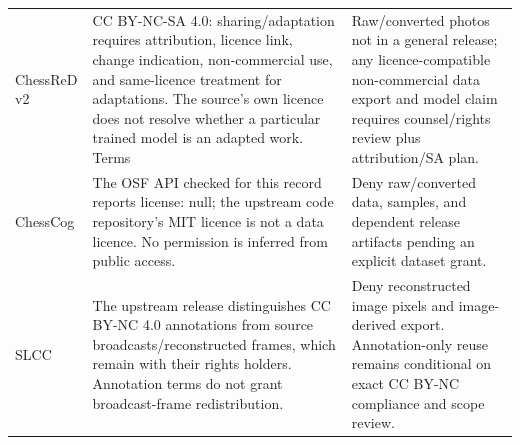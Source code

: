 \begin{longtable}{>{\raggedright\arraybackslash}p{.18\linewidth}>{\raggedright\arraybackslash}p{.39\linewidth}>{\raggedright\arraybackslash}p{.35\linewidth}}
ChessReD v2 & %
CC BY-NC-SA 4.0: sharing/adaptation requires attribution, licence link, change indication, non-commercial use, and same-licence treatment for adaptations. The source's own licence does not resolve whether a particular trained model is an adapted work. Terms & %
Raw/converted photos not in a general release; any licence-compatible non-commercial data export and model claim requires counsel/rights review plus attribution/SA plan. \\ %

ChessCog & %
The OSF API checked for this record reports license: null; the upstream code repository's MIT licence is not a data licence. No permission is inferred from public access. & %
Deny raw/converted data, samples, and dependent release artifacts pending an explicit dataset grant. \\ %

SLCC & %
The upstream release distinguishes CC BY-NC 4.0 annotations from source broadcasts/reconstructed frames, which remain with their rights holders. Annotation terms do not grant broadcast-frame redistribution. & %
Deny reconstructed image pixels and image-derived export. Annotation-only reuse remains conditional on exact CC BY-NC compliance and scope review. \\ %


\end{longtable}
